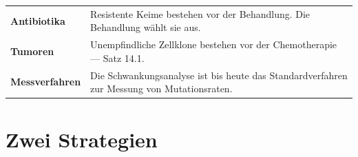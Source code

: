 \begin{merksatz}
\begin{center}
{\small
\renewcommand{\arraystretch}{1.5}
\begin{tabular}{@{}P{2.4cm}P{6.2cm}@{}}
\toprule
\textbf{Antibiotika} & Resistente Keime bestehen vor der Behandlung. Die Behandlung wählt sie aus.\\
\textbf{Tumoren} & Unempfindliche Zellklone bestehen vor der Chemotherapie --- Satz 14.1.\\
\textbf{Messverfahren} & Die Schwankungsanalyse ist bis heute das Standardverfahren zur Messung von Mutationsraten.\\
\bottomrule
\end{tabular}}
\end{center}

\begin{center}
\begin{minipage}{0.88\textwidth}
\end{minipage}
\end{center}
\end{merksatz}

\section{Zwei Strategien}

